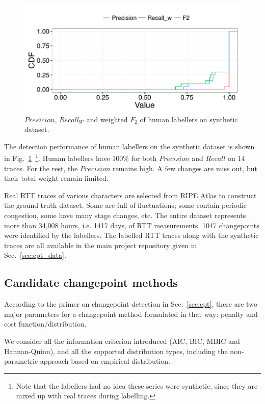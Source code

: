 \begin{figure}[!htb]
\centering
\includegraphics[width=.72\textwidth]{gfx/chap4/antoine_eval.pdf}
\caption{$Presicion$, $Recall_W$ and weighted $F_2$ of human labellers on synthetic dataset.}
\label{fig:antoine_eval}
\end{figure}
The detection performance of human labellers on the synthetic dataset is shown in Fig.~\ref{fig:antoine_eval}~\footnote{Note that the labellers had no idea these series were synthetic, since they are mixed up with real traces during labelling.}. 
Human labellers have $100\%$ for both $Precision$ and $Recall$ on 14 traces.
For the rest, the $Precision$ remains high. A few changes are miss out, but their total weight remain limited.

Real RTT traces of various characters are selected from RIPE Atlas to construct the ground truth dataset. Some are full of fluctuations; some contain periodic congestion, some have many stage changes, etc.
The entire dataset represents more than 34,008 hours, i.e. 1417 days, of RTT measurements. 1047 changepoints were identified by the labellers.
The labelled RTT traces along with the synthetic traces are all available in the main project repository given in Sec.~\ref{sec:cpt_data}.

\subsection{Candidate changepoint methods}
\label{sec:method}
According to the primer on changepoint detection in Sec.~\ref{sec:cpt}, there are two major parameters for a changepoint method formulated in that way: penalty and cost function/distribution.

We consider all the information criterion introduced (AIC, BIC, MBIC and Hannan-Quinn), and all the supported distribution types, including the non-parametric approach based on empirical distribution.

